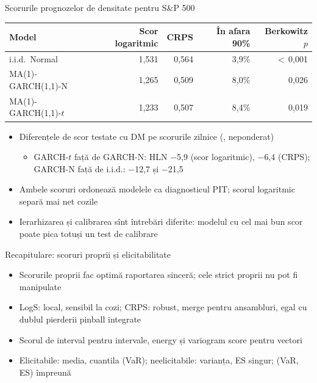 \begin{frame}{Scorurile prognozelor de densitate pentru S\&P 500}
\itemsize{\footnotesize}
\begin{center}
\footnotesize
\begin{tabular}{lrrrr}
\toprule
\textbf{Model} & \textbf{Scor logaritmic} & \textbf{CRPS} & \textbf{În afara 90\%} & \textbf{Berkowitz $p$} \\
\midrule
i.i.d.\ Normal & 1{,}531 & 0{,}564 & 3{,}9\% & $<$\,0{,}001 \\
MA(1)-GARCH(1,1)-N & 1{,}265 & 0{,}509 & 8{,}0\% & 0{,}026 \\
MA(1)-GARCH(1,1)-$t$ & 1{,}233 & 0{,}507 & 8{,}4\% & 0{,}019 \\
\bottomrule
\end{tabular}
\end{center}
\begin{itemize}
    \item Diferențele de scor testate cu DM pe scorurile zilnice (, neponderat)
    \begin{itemize}
        \item GARCH-$t$ față de GARCH-N: HLN \ensuremath{-}5{,}9 (scor logaritmic), \ensuremath{-}6{,}4 (CRPS); GARCH-N față de i.i.d.: \ensuremath{-}12{,}7 și \ensuremath{-}21{,}5
    \end{itemize}
    \item Ambele scoruri ordonează modelele ca diagnosticul PIT; scorul logaritmic separă mai net cozile
    \item Ierarhizarea și calibrarea sînt întrebări diferite: modelul cu cel mai bun scor poate pica totuși un test de calibrare
\end{itemize}
\end{frame}

\begin{frame}{Recapitulare: scoruri proprii și elicitabilitate}
\itemsize{\small}
\begin{itemize}
    \item Scorurile proprii fac optimă raportarea sinceră; cele strict proprii nu pot fi manipulate
    \item LogS: local, sensibil la cozi; CRPS: robust, merge pentru ansambluri, egal cu dublul pierderii pinball integrate
    \item Scorul de interval pentru intervale, energy și variogram score pentru vectori
    \item Elicitabile: media, cuantila (VaR); neelicitabile: varianța, ES singur; (VaR, ES) împreună
\end{itemize}
\end{frame}


